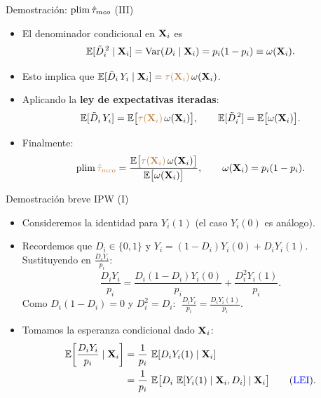 \documentclass[10pt, xcolor=dvipsnames]{beamer}
\begin{document}
\begin{frame}{Demostración: $\plim \hat\tau_{mco}$ (III)}
\begin{itemize}
    \item El denominador condicional en \(\textbf{X}_i\) es
    \[
        \operatorname{\mathbb{E}}[\tilde D_i^{\,2} \mid \textbf{X}_i]
        = \operatorname{Var}(D_i \mid \textbf{X}_i)
        = p_i(1 - p_i)
        \equiv \omega(\textbf{X}_i).
    \]
    \item Esto implica que \(\operatorname{\mathbb{E}}[\tilde D_i \, Y_i \mid \textbf{X}_i] = \textcolor{brown}{\tau(\textbf{X}_i)} \, \omega(\textbf{X}_i)\).
    \vspace{1em}
    \item Aplicando la \textbf{ley de expectativas iteradas}:
    \[
        \operatorname{\mathbb{E}}[\tilde D_i \, Y_i] = \operatorname{\mathbb{E}}\!\big[\textcolor{brown}{\tau(\textbf{X}_i)} \, \omega(\textbf{X}_i)\big],
        \qquad
        \operatorname{\mathbb{E}}[\tilde D_i^{\,2}] = \operatorname{\mathbb{E}}\!\big[\omega(\textbf{X}_i)\big].
    \]
    \item Finalmente:
    \[
        \plim \brown{\hat\tau_{mco}}
        = \frac{\EX\!\big[\brown{\tau(\XB_i)} \, \omega(\XB_i)\big]}
               {\EX\!\big[\omega(\XB_i)\big]},
        \qquad \omega(\XB_i) = p_i(1-p_i).
    \]
\end{itemize}
\hyperlink{DIAP:MCO}{{}}
\end{frame}


\begin{frame}{Demostración breve IPW (I)}\label{Demostracion-IPW}
\begin{itemize}
    \item Consideremos la identidad para $Y_i(1)$ (el caso $Y_i(0)$ es análogo).
    \vspace{0.5em}
    \item Recordemos que $D_i \in \{0,1\}$ y \(Y_i = (1-D_i)Y_i(0) + D_i Y_i(1)\). Sustituyendo en $\tfrac{D_i Y_i}{p_i}$:
    \vspace{-0.5em}
    \[
    \frac{D_i Y_i}{p_i} 
    = \frac{D_i (1-D_i) Y_i(0)}{p_i} + \frac{D_i^2 Y_i(1)}{p_i}.
    \]
    Como $D_i(1-D_i)=0$ y $D_i^2=D_i$: \(\;\frac{D_i Y_i}{p_i} = \frac{D_i Y_i(1)}{p_i}\).
    \item Tomamos la esperanza condicional dado $\textbf{X}_i$:
    \begin{align*}
    \begin{split}
    \operatorname{\mathbb{E}}\!\left[\frac{D_i Y_i}{p_i} \mid \textbf{X}_i\right] &= \frac{1}{p_i}\,\operatorname{\mathbb{E}}[D_i Y_i(1)\mid \textbf{X}_i] \\
      &= \frac{1}{p_i}\,\operatorname{\mathbb{E}}\!\big[D_i\,\operatorname{\mathbb{E}}[Y_i(1)\mid \textbf{X}_i,D_i]\mid \textbf{X}_i\big] \qquad (\text{\textcolor{blue}{LEI}}).          
    \end{split}
    \end{align*}
\end{itemize}
\end{frame}
\end{document}
